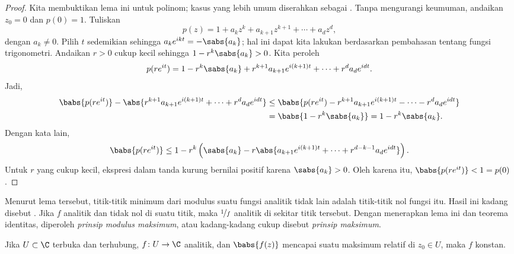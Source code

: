 \begin{proof}
Kita membuktikan lema ini untuk polinom; kasus yang lebih umum diserahkan sebagai
.
Tanpa mengurangi keumuman, andaikan $z_0 = 0$ dan $p(0) = 1$.  Tuliskan
\begin{equation*}
p(z) = 1+a_kz^k + a_{k+1}z^{k+1} + \cdots + a_d z^d ,
\end{equation*}
dengan $a_k \neq 0$.  Pilih $t$ sedemikian sehingga $a_k e^{ikt} = -\sabs{a_k}$; hal
ini dapat kita lakukan berdasarkan pembahasan tentang fungsi trigonometri.  Andaikan
$r > 0$ cukup kecil sehingga
$1-r^k \sabs{a_k} > 0$.  Kita peroleh
\begin{equation*}
p(r e^{it}) =
1-r^k \sabs{a_k} + r^{k+1}a_{k+1}e^{i(k+1)t} + \cdots + r^{d}a_{d}e^{idt} .
\end{equation*}
Jadi,
\begin{equation*}
\begin{split}
\babs{
p(r e^{it}) } - \abs{
r^{k+1}a_{k+1}e^{i(k+1)t} + \cdots + r^{d}a_{d}e^{idt}
}
&
\leq
\babs{
p(r e^{it}) 
- r^{k+1}a_{k+1}e^{i(k+1)t} - \cdots - r^{d}a_{d}e^{idt}
}
\\
&
=
\babs{
1-r^k \sabs{a_k}
}
=
1-r^k \sabs{a_k} .
\end{split}
\end{equation*}
Dengan kata lain,
\begin{equation*}
\babs{
p(r e^{it}) }
\leq
1-r^k \left( \sabs{a_k}
-
r
\abs{
a_{k+1}e^{i(k+1)t} + \cdots + r^{d-k-1}a_{d}e^{idt}
}
\right) .
\end{equation*}
Untuk $r$ yang cukup kecil, ekspresi dalam tanda kurung bernilai positif
karena $\sabs{a_k} > 0$.  Oleh karena itu, $\babs{p(re^{it})} < 1 = p(0)$.
\end{proof}

Menurut lema tersebut, titik-titik minimum dari modulus suatu fungsi analitik
tidak lain adalah titik-titik nol fungsi itu.
Hasil ini kadang disebut \emph{}.
Jika $f$ analitik dan tidak nol di suatu titik,
maka $\nicefrac{1}{f}$ analitik di sekitar titik tersebut.  Dengan menerapkan lema ini dan
teorema identitas, diperoleh \emph{prinsip modulus maksimum}, atau kadang-kadang
cukup disebut \emph{prinsip maksimum}.

\begin{thm}%
%
\label{thm:maxprinciple}
Jika $U \subset \C$ terbuka dan terhubung,
$f \colon U \to \C$ analitik, dan $\babs{f(z)}$ mencapai suatu
maksimum relatif di $z_0 \in U$, maka $f$ konstan.
\end{thm}

